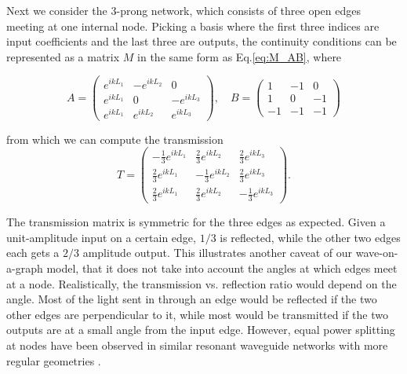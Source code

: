 Next we consider the 3-prong network, which consists of three open edges meeting at one internal node. Picking a basis where the first three indices are input coefficients and the last three are outputs, the continuity conditions can be represented as a matrix $M$ in the same form as Eq.\ref{eq:M_AB}, where

\begin{equation}
    \label{eq:AB_3prong}
    A = \begin{pmatrix}
    e^{ikL_1} & -e^{ikL_2} & 0           \\[0.3em]
       e^{ikL_1} & 0           & -e^{ikL_3} \\[0.3em]
       e^{ikL_1}  & e^{ikL_2} & e^{ikL_3} \end{pmatrix}, \quad
    B = \begin{pmatrix}
        1 & -1 & 0           \\[0.3em]
        1 & 0 & -1 \\[0.3em]
        -1  & -1 & -1 \end{pmatrix}
\end{equation}

from which we can compute the transmission
\begin{equation}
    \label{eq:T_3prong}
    T = \begin{pmatrix}
    -\frac{1}{3}e^{ikL_1} & \frac{2}{3}e^{ikL_2} & \frac{2}{3}e^{ikL_3} \\[0.3em]
    \frac{2}{3}e^{ikL_1} & -\frac{1}{3}e^{ikL_2} & \frac{2}{3}e^{ikL_3} \\[0.3em]
    \frac{2}{3}e^{ikL_1}  & \frac{2}{3}e^{ikL_2} & -\frac{1}{3}e^{ikL_3} \end{pmatrix}.
\end{equation}

The transmission matrix is symmetric for the three edges as expected. Given a unit-amplitude input on a certain edge, $1/3$ is reflected, while the other two edges each gets a $2/3$ amplitude output. This illustrates another caveat of our wave-on-a-graph model, that it does not take into account the angles at which edges meet at a node. Realistically, the transmission vs. reflection ratio would depend on the angle. Most of the light sent in through an edge would be reflected if the two other edges are perpendicular to it, while most would be transmitted if the two outputs are at a small angle from the input edge. However, equal power splitting at nodes have been observed in similar resonant waveguide networks with more regular geometries \cite{Feigenbaum2010}.

